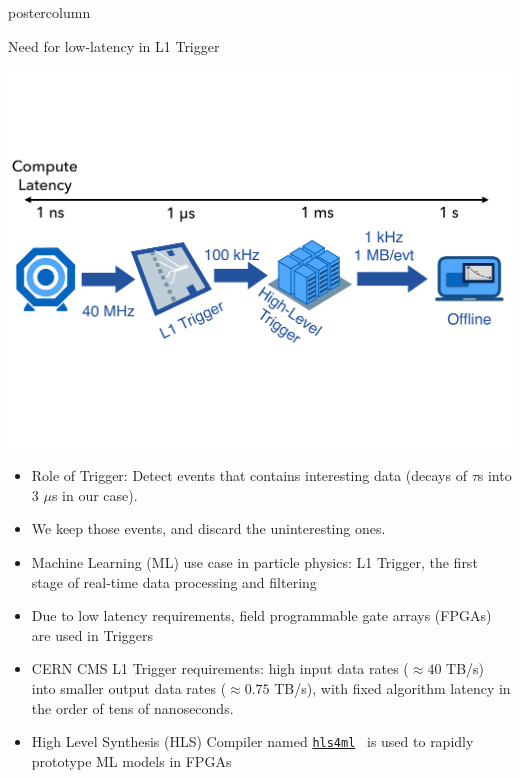 \documentclass[final,hyperref={pdfpagelabels=false}]{beamer}
\newcommand{\hlsfml}{{\href{https://github.com/hls-fpga-machine-learning/hls4ml}{\texttt{hls4ml}}}}
\begin{document}
\begin{frame}
\begin{columns}
\begin{column}{.49\textwidth}
\begin{beamercolorbox}[center,wd=\textwidth]{postercolumn}
\begin{minipage}[T]{.95\textwidth}
{            \begin{block}{Need for low-latency in L1 Trigger}
                  \begin{center}
                    \includegraphics[viewport=0 200 1024 600, clip=true,width=\linewidth]{figures/cms_dataflow.pdf}
                  \end{center}
                  \begin{itemize}
                  \item Role of Trigger: Detect events that contains interesting data (decays of $\tau$s into 3 $\mu$s in our case).
                  \item We keep those events, and discard the uninteresting ones.
                    \item Machine Learning (ML) use case in particle physics: L1 Trigger, the first stage of real-time data processing and filtering
                     \item Due to low latency requirements, field programmable gate arrays (FPGAs) are used in Triggers
                    \item CERN CMS L1 Trigger requirements: high input data rates ($\approx40$ TB/s) into smaller output data rates ($\approx0.75$ TB/s), 
                    with fixed algorithm latency in the order of tens of nanoseconds.
                    \item High Level Synthesis (HLS) Compiler named \hlsfml~ is used to rapidly prototype ML models in FPGAs
              \end{itemize}
            \end{block}
            
}
\end{minipage}
\end{beamercolorbox}
\end{column}
\end{columns}
\end{frame}
\end{document}
